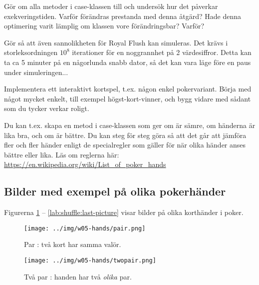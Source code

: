 \Task Gör om alla metoder i case-klassen  till  och undersök hur det påverkar exekveringstiden. Varför förändras prestanda med denna åtgärd? Hade denna optimering varit lämplig om klassen  vore förändringsbar? Varför?

\Task Gör så att även sannolikheten för Royal Flush kan simuleras. Det krävs i storleksordningen $10^8$ iterationer för en noggrannhet på 2 värdesiffror. Detta kan ta ca 5 minuter på en någorlunda snabb dator, så det kan vara läge före en paus under simuleringen...

\Task Implementera ett interaktivt kortspel, t.ex. någon enkel pokervariant. Börja med något mycket enkelt, till exempel högst-kort-vinner, och bygg vidare med sådant som du tycker verkar roligt.

Du kan t.ex. skapa en metod  i case-klassen  som ger  om  är sämre,  om händerna är lika bra, och  om  är bättre. Du kan steg för steg göra så att det går att jämföra fler och fler händer enligt de specialregler som gäller för när olika händer anses bättre eller lika. Läs om reglerna här: \url{https://en.wikipedia.org/wiki/List_of_poker_hands}



\subsection{Bilder med exempel på olika pokerhänder}\label{shuffle:hands}

Figurerna \ref{lab:shuffle:first-picture} -- \ref{lab:shuffle:last-picture} visar bilder på olika korthänder i poker.

\newcommand{\CardWidth}{0.45\textwidth}
\newcommand{\CardCaptionWidth}{0.5\textwidth}

\begin{figure}[H]
 \begin{minipage}[c]{\CardWidth}
  \texttt{[image: ../img/w05-hands/pair.png]}
 \end{minipage}\hfill
 \begin{minipage}[c]{\CardCaptionWidth}
  \caption{Par : två kort har samma valör.}
   \label{lab:shuffle:first-picture}
 \end{minipage}
\end{figure}

\begin{figure}[H]
 \begin{minipage}[c]{\CardWidth}
  \texttt{[image: ../img/w05-hands/twopair.png]}
 \end{minipage}\hfill
 \begin{minipage}[c]{\CardCaptionWidth}
  \caption{Två par : handen har två \emph{olika} par.}
 \end{minipage}
\end{figure}

